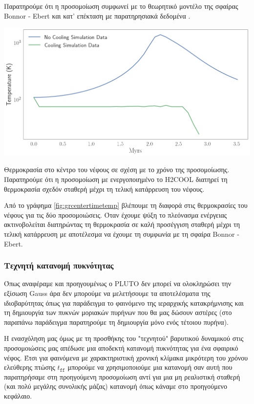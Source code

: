  Παρατηρούμε ότι η προσομοίωση συμφωνεί με το θεωρητικό μοντέλο της σφαίρας Bonnor - Ebert και κατ' επέκταση με παρατηρησιακά δεδομένα .  



\begin{marginfigure}
	\centering
	\includegraphics[width=1\linewidth]{DataImages/GRcenterTimeTemp}
	\caption{Θερμοκρασία στο κέντρο του νέφους σε σχέση με το χρόνο της προσομοίωσης. Παρατηρούμε ότι η προσομοίωση με ενεργοποιημένο το H2COOL διατηρεί τη θερμοκρασία σχεδόν σταθερή μέχρι τη τελική κατάρρευση του νέφους.}
	\label{fig:grcentertimetemp}
\end{marginfigure}

Από το γράφημα \ref{fig:grcentertimetemp} βλέπουμε τη διαφορά στις θερμοκρασίες του νέφους για τις δύο προσομοιώσεις. Όταν έχουμε ψύξη το πλεόνασμα ενέργειας ακτινοβολείται διατηρώντας τη θερμοκρασία σε καλή προσέγγιση σταθερή μέχρι τη τελική κατάρρευση με αποτέλεσμα να έχουμε τη συμφωνία με τη σφαίρα Bonnor - Ebert. 


\subsubsection{Τεχνητή κατανομή πυκνότητας}
Όπως αναφέραμε και προηγουμένως ο PLUTO δεν μπορεί να ολοκληρώσει την εξίσωση Gauss  άρα δεν μπορούμε να μελετήσουμε τα αποτελέσματα της ιδιοβαρύτητας όπως για παράδειγμα το φαινόμενο της ιεραρχικής κατακρήμνισης και τη δημιουργία των πυκνών μοριακών πυρήνων που θα μας δώσουν αστέρες (στο παραπάνω παράδειγμα παρατηρούμε τη δημιουργία μόνο ενός τέτοιου πυρήνα). 

Η ενασχόληση μας όμως με τη προσθήκης του "τεχνητού" βαρυτικού δυναμικού στις προσομοιώσεις μας απέδωσε μια αποδεκτή κατανομή πυκνότητας για ένα σφαιρικό νέφος. Έτσι για φαινόμενα με χαρακτηριστική χρονική κλίμακα μικρότερη του χρόνου ελεύθερης πτώσης $t_\mathtt{ff}$ μπορούμε να χρησιμοποιούμε μια κατανομή σαν αυτή που παρατηρήσαμε στη προηγούμενη προσομοίωση αντί για μια μη ρεαλιστική σταθερή (και πολύ μεγάλης συνολικής μάζας) κατανομή όπως κάναμε στο προηγούμενο κεφάλαιο.

